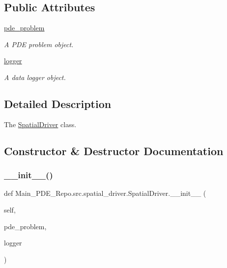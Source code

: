 \subsection*{Public Attributes}
\begin{DoxyCompactItemize}
\item 
\hyperlink{classMain__PDE__Repo_1_1src_1_1spatial__driver_1_1SpatialDriver_a2a61190d268b74c9388d3bbe3e3cce93}{pde\+\_\+problem}
\begin{DoxyCompactList}\small\item\em A P\+DE problem object. \end{DoxyCompactList}\item 
\hyperlink{classMain__PDE__Repo_1_1src_1_1spatial__driver_1_1SpatialDriver_aac2299eb18270b9cc3c17d2d07e0dc57}{logger}
\begin{DoxyCompactList}\small\item\em A data logger object. \end{DoxyCompactList}\end{DoxyCompactItemize}


\subsection{Detailed Description}
The \hyperlink{classMain__PDE__Repo_1_1src_1_1spatial__driver_1_1SpatialDriver}{Spatial\+Driver} class. 

\subsection{Constructor \& Destructor Documentation}
\mbox{\label{classMain__PDE__Repo_1_1src_1_1spatial__driver_1_1SpatialDriver_a6661666d68acd2e1cbaeed8fbd30aa8c}} 
\subsubsection{\texorpdfstring{\+\_\+\+\_\+init\+\_\+\+\_\+()}{\_\_init\_\_()}}
{\footnotesize\ttfamily def Main\+\_\+\+P\+D\+E\+\_\+\+Repo.\+src.\+spatial\+\_\+driver.\+Spatial\+Driver.\+\_\+\+\_\+init\+\_\+\+\_\+ (\begin{DoxyParamCaption}\item[{}]{self,  }\item[{}]{pde\+\_\+problem,  }\item[{}]{logger }\end{DoxyParamCaption})}



